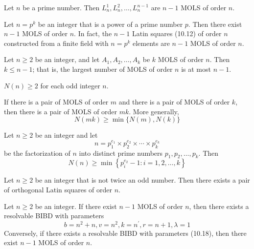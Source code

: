 \begin{theorem}
  \label{thm:10.4.3}
  Let $n$ be a prime number. Then $L_n^1, L_n^2, \ldots , L_n^{n-1}$ are $n - 1$ MOLS of order $n$.
\end{theorem}

\begin{theorem}
  \label{thm:10.4.4}
  Let $n = p^k$ be an integer that is a power of a prime number $p$. Then there exist $n - 1$ MOLS 
  of order $n$. In fact, the $n - 1$ Latin squares (10.12) of order $n$ constructed from a finite 
  field with $n = p^k$ elements are $n - 1$ MOLS of order $n$.
\end{theorem}

\begin{theorem}
  \label{thm:10.4.5}
  Let $n \geq 2$ be an integer, and let $A_1, A_2,\ldots, A_k$ be $k$ MOLS of order $n$. Then $k 
  \leq n - 1$; that is, the largest number of MOLS of order $n$ is at most $n - 1$.
\end{theorem}

\begin{theorem}
  \label{thm:10.4.6}
  $N(n) \geq 2$ for each odd integer $n$.
\end{theorem}

\begin{theorem}
  \label{thm:10.4.7}
  If there is a pair of MOLS of order $m$ and there is a pair of MOLS of order $k$, then there is a 
  pair of MOLS of order $mk$. More generally,
  \[ N(mk) \geq \min\{N(m), N(k)\} \]
\end{theorem}

\begin{theorem}
  \label{thm:10.4.8}
  Let $n \geq 2$ be an integer and let
  $$
  n=p_1^{e_1} \times p_2^{e_2} \times \cdots \times p_k^{e_k}
  $$
  be the factorization of $n$ into distinct prime numbers $p_1, p_2, \ldots, p_k$. Then
  $$
  N(n) \geq \min \left\{p_i^{e_2}-1: i=1,2, \ldots, k\right\}
  $$
\end{theorem}

\begin{corollary}
  \label{cor:10.4.9}
  Let $n \geq 2$ be an integer that is not twice an odd number. Then there exists a pair of 
  orthogonal Latin squares of order $n$.
\end{corollary}

\begin{theorem}
  \label{thm:10.4.10}
  Let $n \geq 2$ be an integer. If there exist $n-1$ MOLS of order $n$, then there exists a 
  resolvable BIBD with parameters
  \begin{equation}\label{10.18}
    b=n^2+n, v=n^2, k=n^{\prime}, r=n+1, \lambda=1
  \end{equation}
  Conversely, if there exists a resolvable BIBD with parameters (10.18), then there exist $n-1$ 
  MOLS of order $n$.
\end{theorem}

